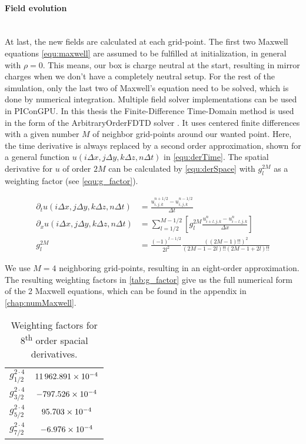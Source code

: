 \documentclass[bachelor_thesis]{subfiles}
\begin{document}
\paragraph*{Field evolution}\hspace{0pt} \\
At last, the new fields are calculated at each grid-point. The first two Maxwell equations \autoref{equ:maxwell} are assumed to be fulfilled at initialization, in general with $\rho=0$. This means, our box is charge neutral at the start, resulting in mirror charges when we don't have a completely neutral setup.
For the rest of the simulation, only the last two of Maxwell's equation need to be solved, which is done by numerical integration. 
Multiple field solver implementations can be used in PIConGPU. In this thesis the Finite-Difference Time-Domain method is used in the form of the ArbitraryOrderFDTD solver \cite{PICRepo}. It uses centered finite differences with a given number $M$ of neighbor grid-points around our wanted point.
Here, the time derivative is always replaced by a second order approximation, shown for a general function $u(i\Delta x,j\Delta y,k\Delta z,n\Delta t)$ in \autoref{equ:derTime}. The spatial derivative for $u$ of order $2M$ can be calculated by \autoref{equ:derSpace} \cite{PICRepo} with $g_l^{2M}$ as a weighting factor (see \autoref{equ:g_factor}).

\begin{align}
\partial_t u(i\Delta x,j\Delta y,k\Delta z,n\Delta t) &= \frac{u_{i,j,k}^{n+1/2} - u_{i,j,k}^{n-1/2}}{\Delta t}								\label{equ:derTime}	\\
\partial_x u(i\Delta x,j\Delta y,k\Delta z,n\Delta t) &=  \sum\limits_{l=1/2}^{M-1/2} \left[ g^{2M}_l \frac{u_{i + l, j, k}^n - u_{i - l, j, k}^n}{\Delta x} \right] 	\label{equ:derSpace}	\\
g^{2M}_l &= \frac{(-1)^{l-1/2}}{2l^2} \frac{((2M-1)!!)^2}{(2M -1 - 2l)!! (2M -1 + 2l)!!}											\label{equ:g_factor}
\end{align}

We use $M=4$ neighboring grid-points, resulting in an eight-order approximation. The resulting weighting factors in \autoref{tab:g_factor} give us the full numerical form of the 2 Maxwell equations, which can be found in the appendix in \autoref{chap:numMaxwell}.
\begin{table}[h]
\begin{center}
\begin{tabular}{ |c|c| }
	\hline
	$g_{1/2}^{2\cdot 4}$ & $\num{11962.891d-04}$ \\ 
	$g_{3/2}^{2\cdot 4}$ & $\num{-797.526d-04}$ \\  
	$g_{5/2}^{2\cdot 4}$ & $\num{95.703d-04}$ \\	
	$g_{7/2}^{2\cdot 4}$ & $\num{-6.976d-04}$ \\
	 \hline
\end{tabular}
\caption{Weighting factors for 8\textsuperscript{th} order spacial derivatives.}\label{tab:g_factor}
\end{center}
\end{table}
\end{document}

